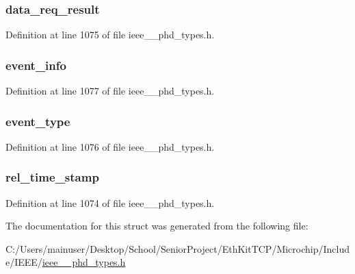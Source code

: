 \subsubsection[{data\+\_\+req\+\_\+result}]{ data\+\_\+req\+\_\+result}\label{struct___data_response_adf6c96e13557345ce1626a9812e070fa}


Definition at line 1075 of file ieee\+\_\+\_\+phd\+\_\+types.\+h.

\hypertarget{struct___data_response_a1107e2194d047e7435991af97a9fa56c}{}
\subsubsection[{event\+\_\+info}]{ event\+\_\+info}\label{struct___data_response_a1107e2194d047e7435991af97a9fa56c}


Definition at line 1077 of file ieee\+\_\+\_\+phd\+\_\+types.\+h.

\hypertarget{struct___data_response_a9291df89a9ec8bde547d68f86d3e6d75}{}
\subsubsection[{event\+\_\+type}]{ event\+\_\+type}\label{struct___data_response_a9291df89a9ec8bde547d68f86d3e6d75}


Definition at line 1076 of file ieee\+\_\+\_\+phd\+\_\+types.\+h.

\hypertarget{struct___data_response_adf9db611c5d3fadb076adae77ed51f52}{}
\subsubsection[{rel\+\_\+time\+\_\+stamp}]{ rel\+\_\+time\+\_\+stamp}\label{struct___data_response_adf9db611c5d3fadb076adae77ed51f52}


Definition at line 1074 of file ieee\+\_\+\_\+phd\+\_\+types.\+h.



The documentation for this struct was generated from the following file\+:\begin{DoxyCompactItemize}
\item 
C\+:/\+Users/mainuser/\+Desktop/\+School/\+Senior\+Project/\+Eth\+Kit\+T\+C\+P/\+Microchip/\+Include/\+I\+E\+E\+E/\hyperlink{ieee__11073__phd__types_8h}{ieee\+\_\+\_\+phd\+\_\+types.\+h}\end{DoxyCompactItemize}
